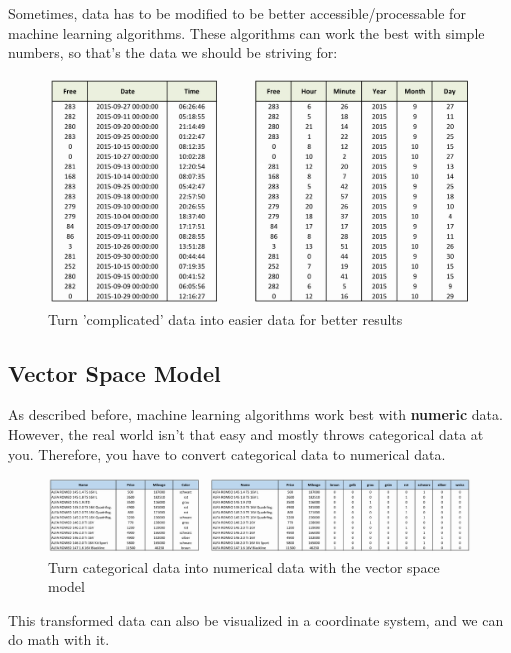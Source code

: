 \documentclass[11pt]{article}
\begin{document}
Sometimes, data has to be modified to be better accessible/processable for machine learning algorithms. These algorithms can work the best with simple numbers, so that's the data we should be striving for:

\begin{figure}[htb!]
    \centering
    \includegraphics[keepaspectratio=true, width=\linewidth]{feature_engineering.png}
    \caption{Turn 'complicated' data into easier data for better results}
    \label{fig:feature_engineering}
\end{figure}

\subsection{Vector Space Model}

As described before, machine learning algorithms work best with \textbf{numeric} data. However, the real world isn't that easy and mostly throws categorical data at you. Therefore, you have to convert categorical data to numerical data.

\begin{figure}[htb!]
    \centering
    \includegraphics[keepaspectratio=true, width=\linewidth]{vector_space_model.png}
    \caption{Turn categorical data into numerical data with the vector space model}
    \label{fig:vector_space_modefig}
\end{figure}

This transformed data can also be visualized in a coordinate system, and we can do math with it.
\end{document}
